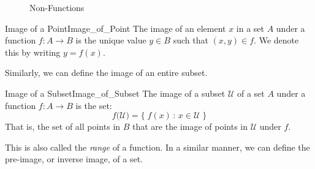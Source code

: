        \begin{figure}[H]
            \centering
            \begin{subfigure}[b]{0.49\textwidth}
                \centering
                \resizebox{\textwidth}{!}{%
                    
                }
            \end{subfigure}
            \begin{subfigure}[b]{0.49\textwidth}
                \centering
                \resizebox{\textwidth}{!}{%
                    
                }
            \end{subfigure}
            \caption{Non-Functions}
            \label{fig:Abstract_Non_Functions}
        \end{figure}
        \begin{ldefinition}{Image of a Point}{Image_of_Point}
            The image of an element $x$ in a set $A$ under a
            function $f:A\rightarrow{B}$ is the unique value
            $y\in{B}$ such that $(x,y)\in{f}$. We denote this
            by writing $y=f(x)$.
        \end{ldefinition}
        Similarly, we can define the image of an entire subset.
        \begin{ldefinition}{Image of a Subset}{Image_of_Subset}
            The image of a subset $\mathcal{U}$ of a set $A$
            under a function $f:A\rightarrow{B}$ is the set:
            \begin{equation}
                f\big(\mathcal{U}\big)=
                    \{\;f(x)\,:\,x\in\mathcal{U}\;\}
            \end{equation}
            That is, the set of all points in $B$ that are the
            image of points in $\mathcal{U}$ under $f$.
        \end{ldefinition}
        This is also called the \textit{range} of a function.
        In a similar manner, we can define the pre-image, or
        inverse image, of a set.
